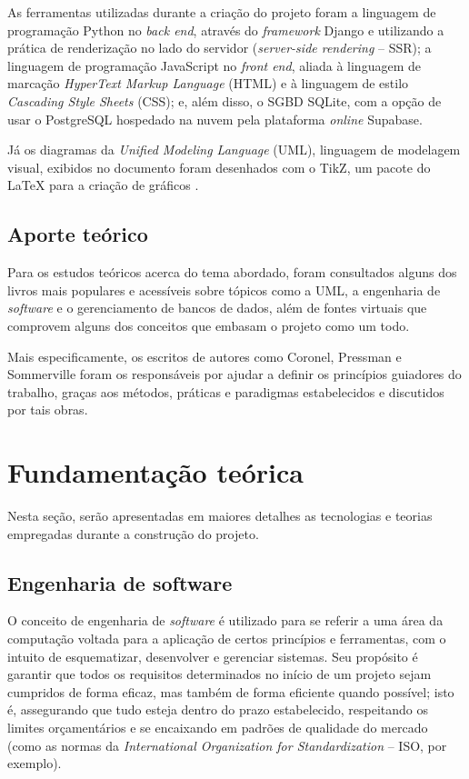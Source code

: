 \documentclass[
  12pt,
  a4paper,
  oneside,
  chapter=TITLE,
  subsection=TITLE,
  sumario=abnt-6027-2012,
  english,
  brazil
]{abntex2}
\begin{document}
As ferramentas utilizadas durante a criação do projeto foram a linguagem
de programação Python no \emph{back end}, através do \emph{framework}
Django e utilizando a prática de renderização no lado do servidor
(\emph{server-side rendering} -- SSR); a linguagem de programação
JavaScript no \emph{front end}, aliada à linguagem de marcação
\emph{HyperText Markup Language} (HTML) e à linguagem de estilo
\emph{Cascading Style Sheets} (CSS); e, além disso, o SGBD
SQLite, com a opção de usar o PostgreSQL hospedado na nuvem pela
plataforma \emph{online} Supabase.

Já os diagramas da \emph{Unified Modeling Language} (UML), linguagem de
modelagem visual, exibidos no documento foram desenhados com o TikZ, um
pacote do LaTeX para a criação de gráficos \cite{tantauTikz}.

\section{Aporte teórico}

Para os estudos teóricos acerca do tema abordado, foram consultados
alguns dos livros mais populares e acessíveis sobre tópicos como a UML,
a engenharia de \emph{software} e o gerenciamento de bancos de dados,
além de fontes virtuais que comprovem alguns dos conceitos que embasam o
projeto como um todo.

Mais especificamente, os escritos de autores como Coronel, Pressman e
Sommerville foram os responsáveis por ajudar a definir os princípios guiadores
do trabalho, graças aos métodos, práticas e paradigmas estabelecidos e
discutidos por tais obras.

\chapter{Fundamentação teórica}

Nesta seção, serão apresentadas em maiores detalhes as tecnologias e
teorias empregadas durante a construção do projeto.

\section{Engenharia de software}

O conceito de engenharia de \emph{software} é utilizado para se referir
a uma área da computação voltada para a aplicação de certos princípios e
ferramentas, com o intuito de esquematizar, desenvolver e gerenciar
sistemas. Seu propósito é garantir que todos os requisitos determinados
no início de um projeto sejam cumpridos de forma eficaz, mas também de
forma eficiente quando possível; isto é, assegurando que tudo esteja
dentro do prazo estabelecido, respeitando os limites orçamentários e se
encaixando em padrões de qualidade do mercado (como as normas da \emph{International Organization for
Standardization} -- ISO, por
exemplo).
\end{document}
